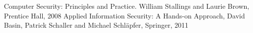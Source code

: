 \documentclass[english]{article}
\begin{document}
\begin{thebibliography}{---}
 Computer Security: Principles and Practice. William Stallings and Laurie Brown, Prentice Hall, 2008
 Applied Information Security: A Hands-on Approach, David Basin, Patrick Schaller and Michael Schl\"apfer, Springer, 2011
\end{thebibliography}
\end{document}
